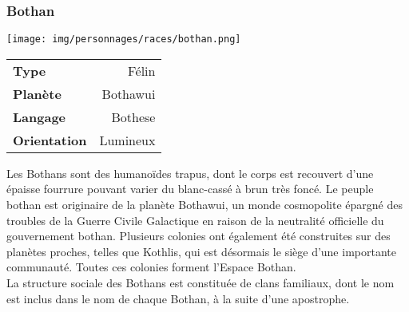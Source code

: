 \subsubsection{Bothan}

\begin{samepage}
	\texttt{[image: img/personnages/races/bothan.png]}
	\vspace{-16\baselineskip}
	\begin{flushright}
		\begin{tabular}{|l|r|}
			\textbf{Type} 			& Félin \\
		   	\textbf{Planète} 		& Bothawui \\
		   	\textbf{Langage} 		& Bothese \\
		   	\textbf{Orientation} 	& Lumineux \\
		\end{tabular}
	\end{flushright}
    \vspace{11\baselineskip}
\end{samepage}

Les Bothans sont des humanoïdes trapus, dont le corps est recouvert d’une épaisse fourrure pouvant varier du blanc-cassé à brun très foncé.
Le peuple bothan est originaire de la planète Bothawui, un monde cosmopolite épargné des troubles de la Guerre Civile Galactique en raison de la neutralité officielle du gouvernement bothan. Plusieurs colonies ont également été construites sur des planètes proches, telles que Kothlis, qui est désormais le siège d’une importante communauté. Toutes ces colonies forment l’Espace Bothan.\\
La structure sociale des Bothans est constituée de clans familiaux, dont le nom est inclus dans le nom de chaque Bothan, à la suite d’une apostrophe.

